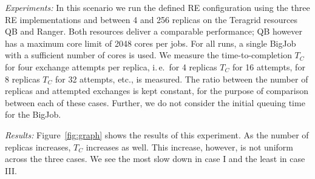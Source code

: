 \documentclass{rspublic}
\newcommand{\alnote}[1]{ {\textcolor{blue} { ***andre: #1 }}}
\newcommand{\alnote}[1]{}
\begin{document}
{\it Experiments: }
In this scenario we run the defined RE configuration using the three RE implementations 
and between 4 and 256 replicas on the Teragrid resources QB and Ranger.
Both resources deliver a comparable performance; QB however has a maximum
core limit of 2048 cores per jobs. For all runs, a single BigJob with a 
sufficient number of cores is used. 
We measure the time-to-completion $T_{C}$ for four 
exchange attempts per replica, i.\,e.\ for 4 replicas $T_{C}$
for 16 attempts, for 8 replicas $T_{C}$ for 32 attempts,
etc., is measured. The ratio between the number of
replicas and attempted exchanges is kept constant, for
the purpose of comparison between each of these cases. Further,
we do not consider the initial queuing time for the BigJob.



{\it Results:} Figure~\ref{fig:graph} shows the results of this 
experiment. As the number of replicas increases, $T_{C}$ increases 
as well. This increase, however, is not uniform across the three cases. 
We see the most slow down in case I and the least in case III.
\end{document}
